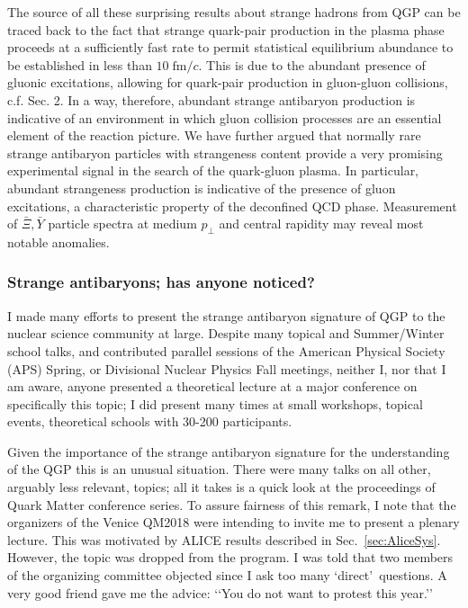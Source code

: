 \begin{mdframed}[linecolor=gray,roundcorner=12pt,backgroundcolor=Dandelion!15,linewidth=1pt,leftmargin=0cm,rightmargin=0cm,topline=true,bottomline=true,skipabove=12pt]
The source of all these surprising results about strange hadrons from QGP can be traced back to the fact that strange quark-pair production in the plasma phase proceeds at a sufficiently fast rate to permit statistical equilibrium abundance to be established in less than $10\;\mathrm{fm}/c$. This is due to the abundant presence of gluonic excitations, allowing for quark-pair production in gluon-gluon collisions, c.f. Sec. 2. In a way, therefore, abundant strange antibaryon production is indicative of an environment in which gluon collision processes are an essential element of the reaction picture. We have further argued that normally rare strange antibaryon particles with strangeness content provide a very promising experimental signal in the search of the quark-gluon plasma. In particular, abundant strangeness production is indicative of the presence of gluon excitations, a characteristic property of the deconfined QCD phase. Measurement of $\bar \Xi, \bar Y$ particle spectra at medium $p_\perp$ and central rapidity may reveal most notable anomalies.
\end{mdframed}

\subsubsection{Strange antibaryons; has anyone noticed?}
I made many efforts to present the strange antibaryon signature of QGP to the nuclear science community at large. Despite many topical and Summer/Winter school talks, and  contributed parallel sessions of the American Physical Society (APS) Spring, or Divisional Nuclear Physics Fall meetings, neither I, nor that I am aware,  anyone   presented a theoretical lecture  at a major conference on specifically this topic; I did present many times at small workshops, topical events, theoretical schools with 30-200 participants.

Given the importance of the strange antibaryon signature for the understanding of the QGP this is an unusual situation. There were many talks on all other, arguably less relevant, topics; all it takes is a quick look at the proceedings of Quark Matter conference series. To assure fairness of this remark, I note that the organizers of the Venice QM2018 were intending to invite me to present a plenary lecture. This was motivated  by  ALICE results described in Sec.~\ref{sec:AliceSys}. However, the topic was dropped from the program. I was told that two members of the organizing committee objected since I ask too many \lq direct\rq\ questions. A very good friend gave me the advice: \lq\lq You do not want to protest this year.\rq\rq 

